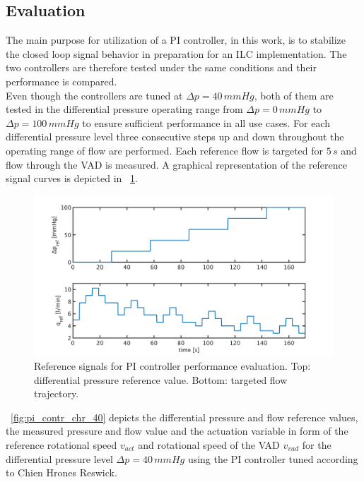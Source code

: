 \subsection{Evaluation}
The main purpose for utilization of a PI controller, in this work, is to stabilize the closed loop signal behavior in preparation for an ILC implementation.
The two controllers are therefore tested under the same conditions and their performance is compared.
\\Even though the controllers are tuned at $\Delta{p}=40\,mmHg$, both of them  are tested in the differential pressure operating range from $\Delta{p}=0\,mmHg$ to $\Delta{p}=100\,mmHg$ to ensure sufficient performance in all use cases.
For each differential pressure level three consecutive steps up and down throughout the operating range of flow are performed. Each reference flow is targeted for $5\,s$ and flow through the VAD is measured. A graphical representation of the reference signal curves is depicted in \figurename~\ref{fig:PI_control_ref_signals}.
\begin{figure}[ht]
  \centering
  \includegraphics[width=\textwidth]{images/chapt_5/PI_control_ref_signals.pdf}
  \caption[Reference signals for PI controller performance evaluation]{Reference signals for PI controller performance evaluation. Top: differential pressure reference value. Bottom: targeted flow trajectory.}
  \label{fig:PI_control_ref_signals}
\end{figure}
\figurename~\ref{fig:pi_contr_chr_40} depicts the differential pressure and flow reference values, the measured pressure and flow value and the actuation variable in form of the reference rotational speed $v_{act}$ and rotational speed of the VAD $v_{vad}$ for the differential pressure level $\Delta{p}=40\,mmHg$ using the PI controller tuned according to Chien Hrones Reswick.

